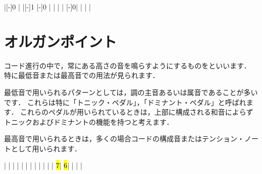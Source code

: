 \documentclass[dvipdfmx,uplatex,b5paper,openany,jbase=12Q,nomag*,textwidth-limit=44%
               ]{gachimuchi}
\begin{document}
\begin{Music}
  \generalmeter{\meterC}%
  \Startpiece
  \NOTes%
  |[-\QNwidth]{0}%
  \en\bar%
  \NOTes%
  |[-\QNwidth]{1}%
  \en\doublebar%
  \NOTes%
  [-\QNwidth]{0}%
  |%
  \en\bar%
  \NOTes%
  |%
  \en\doublebar%
  \NOTes%
  |%
  \en%
  \NOTes%
  [-\QNwidth]{0}|%
  \en%
  \bar%
  \NOTes%
  |%
  \en%
  \NOTes%
  |%
  \en\setdoublebar%
  \endpiece
\end{Music}

\section{オルガンポイント}
コード進行の中で，常にある高さの音を鳴らすようにするものをといいます．
特に最低音または最高音での用法が見られます．

最低音で用いられるパターンとしては，調の主音あるいは属音であることが多いです．
これらは特に「トニック・ペダル」，「ドミナント・ペダル」と呼ばれます．
これらのペダルが用いられているときは，上部に構成される和音によらずトニックおよびドミナントの機能を持つと考えます．

最高音で用いられるときは，多くの場合コードの構成音またはテンション・ノートとして用いられます．

\begin{Music}[0.95\linewidth]
  \generalmeter{\meterC}%
  \Startpiece
  \NOTes%
  |%
  \en%
  \NOTes%
  |%
  \en\bar%
  \NOTes%
  |%
  \en%
  \NOTes%
  |%
  \en\bar%
  \NOTEs%
  |%
  \en\doublebar%
  \NOTes%
  |%
  \en%
  \NOTes%
  |%
  \en\bar%
  \NOTes%
  |%
  \en%
  \NOTes%
  |%
  \en%
  \doublebar%
  \NOTes%
  \hl{7}|%
  \en%
  \NOTes%
  \hl{6}|%
  \en%
  \bar%
  \NOTes%
  |%
  \en%
  \NOTes%
  |%
  \en\setdoublebar%
  \endpiece
\end{Music}
\end{document}
